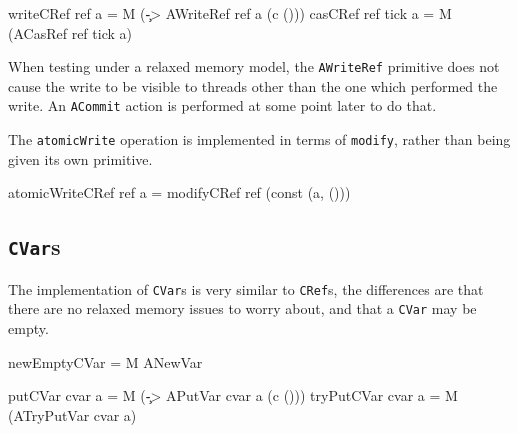 \begin{haskellcode}
writeCRef ref      a = M (\c -> AWriteRef ref a (c ()))
casCRef   ref tick a = M (ACasRef ref tick a)
\end{haskellcode}



When testing under a relaxed memory model, the \verb|AWriteRef|
primitive does not cause the write to be visible to threads other than
the one which performed the write. An \verb|ACommit| action is
performed at some point later to do that.


The \verb|atomicWrite| operation is implemented in terms of
\verb|modify|, rather than being given its own primitive.

\begin{haskellcode}
atomicWriteCRef ref a = modifyCRef ref (const (a, ()))
\end{haskellcode}

\subsection{\texttt{CVar}s}
\label{sec:execution-primops-cvar}

The implementation of \verb|CVar|s is very similar to \verb|CRef|s,
the differences are that there are no relaxed memory issues to worry
about, and that a \verb|CVar| may be empty.

\begin{haskellcode}
newEmptyCVar = M ANewVar
\end{haskellcode}


\begin{haskellcode}
putCVar    cvar a = M (\c -> APutVar cvar a (c ()))
tryPutCVar cvar a = M (ATryPutVar cvar a)
\end{haskellcode}


